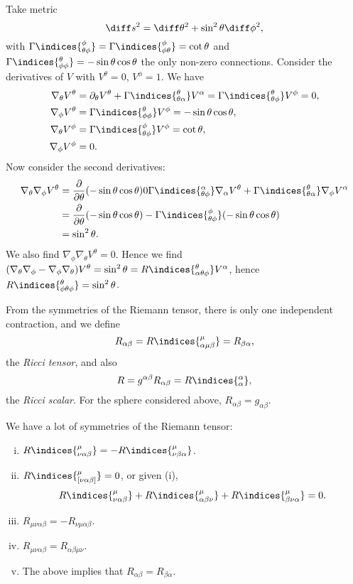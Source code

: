 \documentclass[12pt]{article}
\begin{document}
\begin{exbox}
	Take metric
	\[
	\diff s^2 = \diff \theta^2 + \sin^2 \theta \diff \phi^2,
	\]
	with $\Gamma\indices{^\phi_{\theta\phi}} = \Gamma\indices{^\phi_{\phi\theta}} = \cot \theta$ and $\Gamma\indices{^\theta_{\phi\phi}} = - \sin \theta \cos \theta$ the only non-zero connections. Consider the derivatives of $V$ with $V^\theta = 0$, $V^\phi = 1$. We have
	\begin{align*}
		\nabla_\theta V^\theta &= \partial_\theta V^\theta + \Gamma\indices{^\theta_{\theta\alpha}} V^\alpha = \Gamma\indices{^\theta_{\theta\phi}} V^\phi = 0, \\
		\nabla_\phi V^\theta &= \Gamma\indices{^\theta_{\phi\phi}} V^\phi = - \sin\theta \cos\theta, \\
		\nabla_\theta V^\phi &= \Gamma\indices{^\phi_{\theta\phi}} V^\phi = \cot \theta, \\
		\nabla_\phi V^\phi &= 0.
	\end{align*}
	Now consider the second derivatives:
	\begin{align*}
		\nabla_\theta \nabla_\phi V^\theta &= \frac{\partial}{\partial \theta} (- \sin \theta \cos \theta) 0 \Gamma\indices{^\alpha_{\theta\phi}} \nabla_\alpha V^\theta + \Gamma\indices{^\theta_{\theta \alpha}} \nabla_\phi V^\alpha \\
						   &= \frac{\partial}{\partial \theta} (- \sin \theta \cos \theta) - \Gamma\indices{^\phi_{\theta\phi}} (- \sin \theta \cos \theta) \\
						   &= \sin^2 \theta.
	\end{align*}
	We also find $\nabla_\phi \nabla_\theta V^\theta = 0$. Hence we find $(\nabla_\theta \nabla_\phi - \nabla_\phi \nabla_\theta) V^\theta = \sin^2 \theta = R\indices{^\theta_{\alpha\theta\phi}}V^\alpha$, hence $R\indices{^\theta_{\phi\theta\phi}} = \sin^2 \theta$.
\end{exbox}

From the symmetries of the Riemann tensor, there is only one independent contraction, and we define
\[
R_{\alpha\beta} = R\indices{^\mu_{\alpha\mu\beta}} = R_{\beta\alpha},
\]
the \emph{Ricci tensor}, and also
\[
	R = g^{\alpha\beta} R_{\alpha\beta} = R\indices{_\alpha^\alpha},
\]
the \emph{Ricci scalar}. For the sphere considered above, $R_{\alpha\beta} = g_{\alpha\beta}$.

We have a lot of symmetries of the Riemann tensor:
\begin{enumerate}[(i)]
	\item $R\indices{^\mu_{\nu\alpha\beta}} = - R\indices{^\mu_{\nu\beta\alpha}}$.
	\item $R\indices{^\mu_{[\nu\alpha\beta]}} = 0$, or given (i),
		\[
			R\indices{^\mu_{\nu\alpha\beta}} + R\indices{^\mu_{\alpha\beta\nu}} + R\indices{^\mu_{\beta\nu\alpha}} = 0.
		\]
	\item $R_{\mu\nu\alpha\beta} = - R_{\nu\mu\alpha\beta}$.
	\item $R_{\mu\nu\alpha\beta} = R_{\alpha\beta\mu\nu}$.
	\item The above implies that $R_{\alpha\beta} = R_{\beta\alpha}$.
\end{enumerate}
\end{document}

